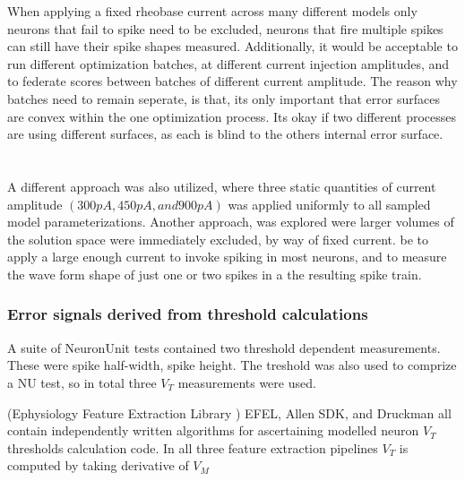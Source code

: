     When applying a fixed rheobase current across many different models only neurons that fail to spike need to be excluded, neurons that fire multiple spikes can still have their spike shapes measured. Additionally, it would be acceptable to run different optimization batches, at different current injection amplitudes, and to federate scores between batches of different current amplitude. The reason why batches need to remain seperate, is that, its only important that error surfaces are convex within the one optimization process. Its okay if two different processes are using different surfaces, as each is blind to the others internal error surface.\\ 
    \\
    \\
    A different approach was also utilized, where three static quantities of current amplitude $(300pA, 450pA, and 900pA)$ was applied uniformly to all sampled model parameterizations. 
    Another approach, was explored were larger volumes of the solution space were immediately excluded, by way of fixed current.
    be to apply a large enough current to invoke spiking in most neurons, and to measure the wave form shape of just one or two spikes in a the resulting spike train.
    
    \subsubsection{Error signals derived from threshold calculations}
    A suite of NeuronUnit tests contained two threshold dependent measurements. These were spike half-width, spike height. The treshold was also used to comprize a NU test, so in total three $V_{T}$ measurements were used.
    
    (Ephysiology Feature Extraction Library \cite{EFEL}) EFEL, Allen SDK, and Druckman all contain independently written algorithms for ascertaining modelled neuron $V_{T}$ thresholds calculation code. In all three feature extraction pipelines $V_{T}$ is computed by taking derivative of $V_{M}$
    
